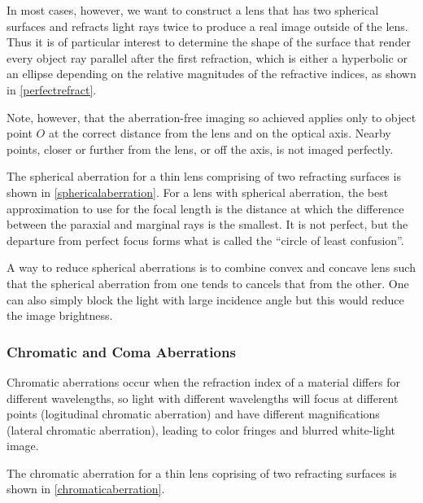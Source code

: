 \documentclass[english,a4paper,12pt]{report}
\begin{document}
In most cases, however, we want to construct a lens that has two spherical surfaces and refracts light rays twice to produce a real image outside of the lens. Thus it is of particular interest to determine the shape of the surface that render every object ray parallel after the first refraction, which is either a hyperbolic or an ellipse depending on the relative magnitudes of the refractive indices, as shown in \cref{perfectrefract}.

Note, however, that the aberration-free imaging so achieved applies only to object point \(O\) at the correct distance from the lens and on the optical axis. Nearby points, closer or further from the lens, or off the axis, is not imaged perfectly.

The spherical aberration for a thin lens comprising of two refracting surfaces is shown in \cref{sphericalaberration}. For a lens with spherical aberration, the best approximation to use for the focal length is the distance at which the difference between the paraxial and marginal rays is the smallest. It is not perfect, but the departure from perfect focus forms what is called the ``circle of least confusion''.

A way to reduce spherical aberrations is to combine convex and concave lens such that the spherical aberration from one tends to cancels that from the other. One can also simply block the light with large incidence angle but this would reduce the image brightness.




\subsubsection{Chromatic and Coma Aberrations}
 
Chromatic aberrations occur when the refraction index of a material differs for different wavelengths, so light with different wavelengths will focus at different points (logitudinal chromatic aberration) and have different magnifications (lateral chromatic aberration), leading to color fringes and blurred white-light image.

The chromatic aberration for a thin lens coprising of two refracting surfaces is shown in \cref{chromaticaberration}.
\end{document}
